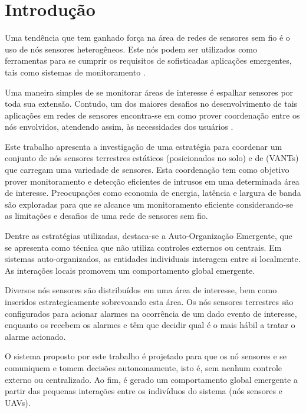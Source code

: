 \section{Introdução}
\label{chap:Introdução}

Uma tendência que tem ganhado força na área de redes de sensores sem fio é o uso
de nós sensores heterogêneos. Este nós podem ser utilizados como ferramentas
para se cumprir os requisitos de sofisticadas aplicações emergentes, tais como
sistemas de monitoramento \cite{Freitas20092}.

Uma maneira simples de se monitorar áreas de interesse é espalhar sensores por
toda sua extensão. Contudo, um dos maiores desafios no desenvolvimento de tais
aplicações em redes de sensores encontra-se em como prover coordenação entre os
nós envolvidos, atendendo assim, às necessidades dos usuários
\cite{Mhatre2005}.

Este trabalho apresenta a investigação de uma estratégia para coordenar um
conjunto de nós sensores terrestres estáticos (posicionados no solo) e de \uavs
(VANTs) que carregam uma variedade de sensores.
Esta coordenação tem como objetivo prover monitoramento e detecção eficientes de
intrusos em uma determinada área de interesse. Preocupações como economia de
energia, latência e largura de banda são exploradas para que se alcance um
monitoramento eficiente considerando-se as limitações e desafios de uma rede de
sensores sem fio.

Dentre as estratégias utilizadas, destaca-se a Auto-Organização
Emergente, que se apresenta como técnica que não utiliza controles externos
ou centrais. Em sistemas auto-organizados, as entidades individuais interagem
entre si localmente. As interações locais promovem um comportamento
global emergente.

Diversos nós sensores são distribuídos em uma área de interesse, bem como inseridos 
estrategicamente \vants sobrevoando esta área. Os nós
sensores terrestres são configurados para acionar alarmes na ocorrência de um
dado evento de interesse, enquanto os
\vants recebem os alarmes e têm que decidir qual \vant é o mais hábil a tratar o
alarme acionado.

O sistema proposto por este trabalho é projetado para que os nó sensores e
\vants se comuniquem e tomem decisões autonomamente, isto é, sem nenhum controle
externo ou centralizado. Ao fim, é gerado um comportamento global emergente a
partir das pequenas interações entre os indivíduos do sistema (nós sensores e
UAVs).


